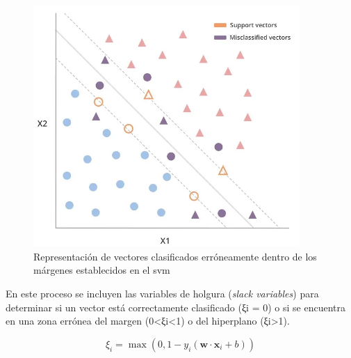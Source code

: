 \vspace{3mm}

\begin{figure}[h!]
    \centering
    \includegraphics[width=0.9\textwidth]{img/teoria/svm2.png}
    \caption{Representación de vectores clasificados erróneamente dentro de los márgenes establecidos en el \acrshort{svm} \cite{svmmedium}}
    \label{fig:svmerror}
\end{figure}

\vspace{3mm}

En este proceso se incluyen las variables de holgura (\textit{slack variables}) para determinar si un vector está correctamente clasificado (ξi = 0) o si se encuentra en una zona errónea del margen (0<ξi<1) o del hiperplano (ξi>1).

\[ \xi_i = \max(0, 1 - y_i (\mathbf{w} \cdot \mathbf{x}_i + b))\]









